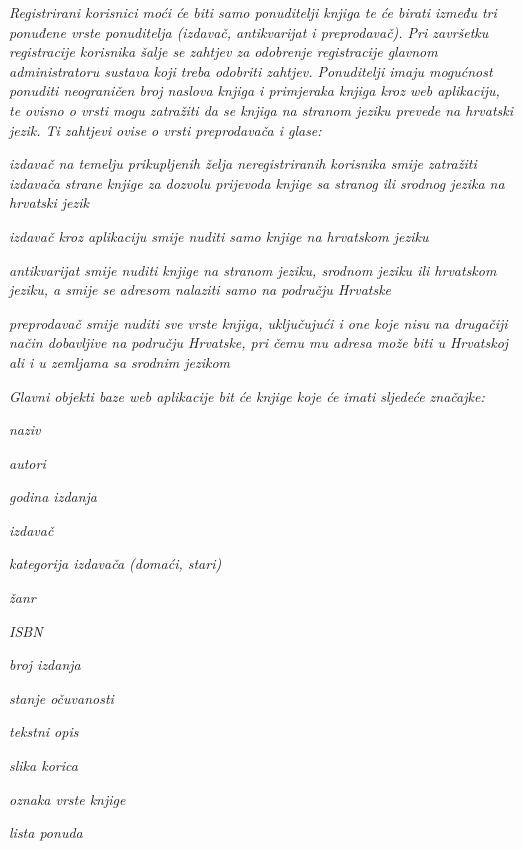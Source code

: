 	\textit{Registrirani korisnici moći će biti samo ponuditelji knjiga te će birati između tri ponuđene vrste ponuditelja (izdavač, antikvarijat i preprodavač). Pri završetku registracije korisnika šalje se zahtjev za odobrenje registracije glavnom administratoru sustava koji treba odobriti zahtjev. Ponuditelji imaju mogućnost ponuditi neograničen broj naslova knjiga i primjeraka knjiga kroz web aplikaciju, te ovisno o vrsti mogu zatražiti da se knjiga na stranom jeziku prevede na hrvatski jezik. Ti zahtjevi ovise o vrsti preprodavača i glase:}
	
	\begin{packed_item}
		\item \textit {izdavač na temelju prikupljenih želja neregistriranih korisnika smije zatražiti izdavača strane knjige za dozvolu prijevoda knjige sa stranog ili srodnog jezika na hrvatski jezik}
		\item \textit {izdavač kroz aplikaciju smije nuditi samo knjige na hrvatskom jeziku}
		\item \textit {antikvarijat smije nuditi knjige na stranom jeziku, srodnom jeziku ili hrvatskom jeziku, a smije se adresom nalaziti samo na području Hrvatske}
		\item \textit {preprodavač smije nuditi sve vrste knjiga, uključujući i one koje nisu na drugačiji način dobavljive na području Hrvatske, pri čemu mu adresa može biti u Hrvatskoj ali i u zemljama sa srodnim jezikom}
	\end{packed_item} 
	
	\textit{Glavni objekti baze web aplikacije bit će knjige koje će imati sljedeće značajke:} 
	
	\begin{packed_item}
		\item \textit {naziv}
		\item \textit {autori}
		\item \textit {godina izdanja}
		\item \textit {izdavač}
		\item \textit {kategorija izdavača (domaći, stari)}
		\item \textit {žanr}
		\item \textit {ISBN}
		\item \textit {broj izdanja}
		\item \textit {stanje očuvanosti}
		\item \textit {tekstni opis}
		\item \textit {slika korica}
		\item \textit {oznaka vrste knjige}
		\item \textit {lista ponuda}
	\end{packed_item}
	
